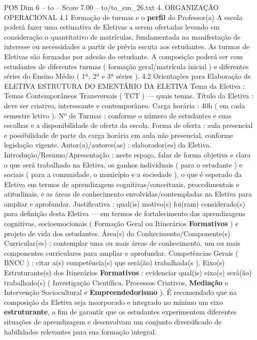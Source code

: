 \begin{textsample}{POS Dim 6 – to – Score 7.00 – to/to\_em\_26.txt}  \label{ex:f6_pos_178}
4.
ORGANIZAÇÃO OPERACIONAL 4.1 Formação de turmas e o \textbf{perfil} do Professor(a) A escola poderá fazer uma estimativa de Eletivas a serem ofertadas levando em consideração o quantitativo de matrículas, fundamentada na manifestação de interesse ou necessidades a partir de prévia escuta aos estudantes.
As turmas de Eletivas são formadas por adesão do estudante.
A composição poderá ser com estudantes de diferentes turmas ( formação geral/matrícula inicial ) e diferentes séries do Ensino Médio ( 1ª, 2ª e 3ª séries ). 4.2 Orientações para Elaboração de ELETIVA ESTRUTURA DO EMENTÁRIO DA ELETIVA Tema da Eletiva : Temas Contemporâneos Transversais ( TCT ) — quais temas.
Título da Eletiva : deve ser criativo, interessante e contemporâneo.
Carga horária : 40h ( em cada semestre letivo ).
Nº de Turmas : conforme o número de estudantes e suas escolhas e a disponibilidade de oferta da escola.
Forma de oferta : aula presencial e possibilidade de parte da carga horária em aula não presencial, conforme legislação vigente.
Autor(a)/autores(as) : elaborador(es) da Eletiva.
Introdução/Resumo/Apresentação : neste espaço, falar de forma objetiva e clara o que será trabalhado na Eletiva, os ganhos individuais ( para o estudante ) e sociais ( para a comunidade, o município e a sociedade ), o que é esperado da Eletiva em termos de aprendizagens cognitivas/conceituais, procedimentais e atitudinais, e as áreas de conhecimento envolvidas/contempladas na Eletiva para ampliar e aprofundar.
Justificativa : qual(is) motivo(s) foi(ram) considerado(s) para definição desta Eletiva — em termos de fortalecimento das aprendizagens cognitivas, socioemocionais ( Formação Geral ou Itinerários \textbf{Formativos} ) e projeto de vida dos estudantes.
Área(s) do Conhecimento/Componente(s) Curricular(es) : contemplar uma ou mais áreas de conhecimento, um ou mais componentes curriculares para ampliar e aprofundar.
Competências Gerais ( BNCC ) : citar a(s) competência(s) que será(ão) trabalhada(s ).
Eixo(s) Estruturante(s) dos Itinerários \textbf{Formativos} : evidenciar qual(is) eixo(s) será(ão) trabalhado(s) ( Investigação Científica, Processos Criativos, \textbf{Mediação} e Intervenção Sociocultural e \textbf{Empreendedorismo} ).
É recomendado que na composição da Eletiva seja incorporado e integrado no mínimo um eixo \textbf{estruturante}, a fim de garantir que os estudantes experimentem diferentes situações de aprendizagem e desenvolvam um conjunto diversificado de habilidades relevantes para sua formação integral.

\end{textsample}
